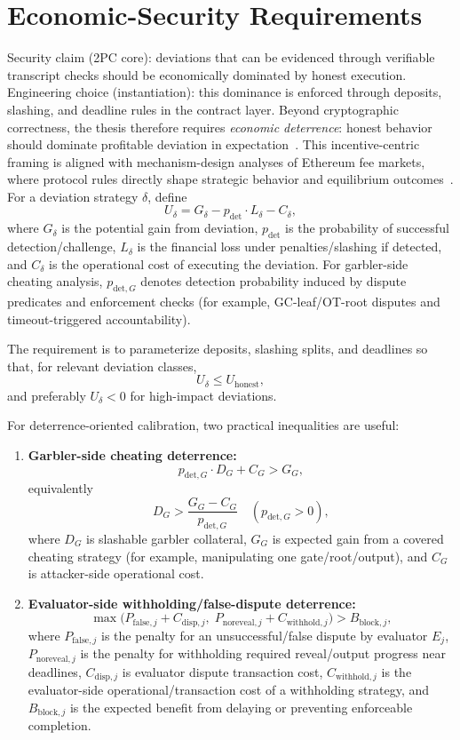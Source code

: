 \documentclass[final,twoside]{vutinfth}
\begin{document}
\section{Economic-Security Requirements}
Security claim (2PC core): deviations that can be evidenced through verifiable
transcript checks should be economically dominated by honest execution.
Engineering choice (instantiation): this dominance is enforced through
deposits, slashing, and deadline rules in the contract layer. Beyond
cryptographic correctness, the thesis therefore requires \emph{economic
deterrence}: honest behavior should dominate profitable deviation in
expectation~\cite{BitPriv2025,Zhu2019PV2PC}.
This incentive-centric framing is aligned with mechanism-design analyses of Ethereum fee markets, where protocol rules directly shape strategic behavior and equilibrium outcomes~\cite{Roughgarden2021EIP1559}.
For a deviation strategy $\delta$, define
\[
U_{\delta}=G_{\delta}-p_{\mathrm{det}}\cdot L_{\delta}-C_{\delta},
\]
where $G_{\delta}$ is the potential gain from deviation,
$p_{\mathrm{det}}$ is the probability of successful detection/challenge,
$L_{\delta}$ is the financial loss under penalties/slashing if detected, and
$C_{\delta}$ is the operational cost of executing the deviation.
For garbler-side cheating analysis, $p_{\mathrm{det},G}$ denotes detection
probability induced by dispute predicates and enforcement checks (for example,
GC-leaf/OT-root disputes and timeout-triggered accountability).

The requirement is to parameterize deposits, slashing splits, and deadlines so
that, for relevant deviation classes,
\[
U_{\delta}\leq U_{\mathrm{honest}},
\]
and preferably $U_{\delta}<0$ for high-impact deviations.

For deterrence-oriented calibration, two practical inequalities are useful:
\begin{enumerate}
\item \textbf{Garbler-side cheating deterrence:}
\[
p_{\mathrm{det},G}\cdot D_G + C_G > G_G,
\]
equivalently
\[
D_G > \frac{G_G-C_G}{p_{\mathrm{det},G}} \quad (p_{\mathrm{det},G}>0),
\]
where $D_G$ is slashable garbler collateral, $G_G$ is expected gain from a
covered cheating strategy (for example, manipulating one gate/root/output), and
$C_G$ is attacker-side operational cost.
\item \textbf{Evaluator-side withholding/false-dispute deterrence:}
\[
\max\!\Big(
P_{\mathrm{false},j}+C_{\mathrm{disp},j},\;
P_{\mathrm{noreveal},j}+C_{\mathrm{withhold},j}
\Big)>B_{\mathrm{block},j},
\]
where $P_{\mathrm{false},j}$ is the penalty for an unsuccessful/false dispute by evaluator $E_j$,
$P_{\mathrm{noreveal},j}$ is the penalty for withholding required reveal/output progress near deadlines,
$C_{\mathrm{disp},j}$ is evaluator dispute transaction cost,
$C_{\mathrm{withhold},j}$ is the evaluator-side operational/transaction cost of a withholding strategy, and
$B_{\mathrm{block},j}$ is the expected benefit from delaying or preventing enforceable completion.
\end{enumerate}
\end{document}

